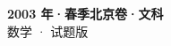\documentclass[zihao=-4, a4paper]{ctexart}
\begin{document}
\begin{center}
  {\Large\bfseries 2003 年·春季北京卷·文科}\\[4pt]
  {\large 数学 · 试题版}
\end{center}
\medskip
{}

\end{document}
